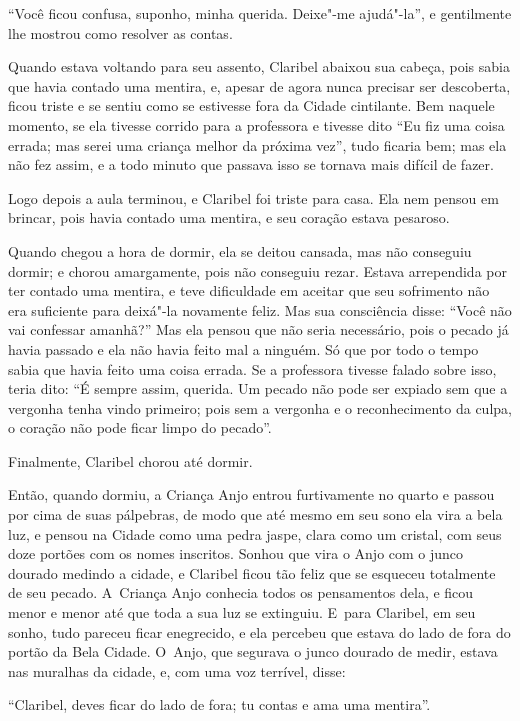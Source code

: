 ``Você ficou confusa, suponho, minha querida. Deixe"-me ajudá"-la'', e
gentilmente lhe mostrou como resolver as contas.

Quando estava voltando para seu assento, Claribel abaixou sua cabeça,
pois sabia que havia contado uma mentira, e, apesar de agora nunca
precisar ser descoberta, ficou triste e se sentiu como se estivesse fora
da Cidade cintilante. Bem naquele momento, se ela tivesse corrido para a
professora e tivesse dito ``Eu fiz uma coisa errada; mas serei uma
criança melhor da próxima vez'', tudo ficaria bem; mas ela não fez
assim, e a todo minuto que passava isso se tornava mais difícil de
fazer.

Logo depois a aula terminou, e Claribel foi triste para casa. Ela nem
pensou em brincar, pois havia contado uma mentira, e seu coração estava
pesaroso.

Quando chegou a hora de dormir, ela se deitou cansada, mas não conseguiu
dormir; e chorou amargamente, pois não conseguiu rezar. Estava
arrependida por ter contado uma mentira, e teve dificuldade em aceitar
que seu sofrimento não era suficiente para deixá"-la novamente feliz. Mas
sua consciência disse: ``Você não vai confessar amanhã?'' Mas ela pensou
que não seria necessário, pois o pecado já havia passado e ela não havia
feito mal a ninguém. Só que por todo o tempo sabia que havia feito uma
coisa errada. Se a professora tivesse falado sobre isso, teria dito: ``É
sempre assim, querida. Um pecado não pode ser expiado sem que a vergonha
tenha vindo primeiro; pois sem a vergonha e o reconhecimento da culpa, o
coração não pode ficar limpo do pecado''.

Finalmente, Claribel chorou até dormir.

Então, quando dormiu, a Criança Anjo entrou furtivamente no quarto e
passou por cima de suas pálpebras, de modo que até mesmo em seu sono ela
vira a bela luz, e pensou na Cidade como uma pedra jaspe, clara como um
cristal, com seus doze portões com os nomes inscritos. Sonhou que vira o
Anjo com o junco dourado medindo a cidade, e Claribel ficou tão feliz
que se esqueceu totalmente de seu pecado. A~Criança Anjo conhecia todos
os pensamentos dela, e ficou menor e menor até que toda a sua luz se
extinguiu. E~para Claribel, em seu sonho, tudo pareceu ficar enegrecido,
e ela percebeu que estava do lado de fora do portão da Bela Cidade. O~Anjo, que segurava o junco dourado de medir, estava nas muralhas da
cidade, e, com uma voz terrível, disse:

``Claribel, deves ficar do lado de fora; tu contas e ama uma mentira''.

